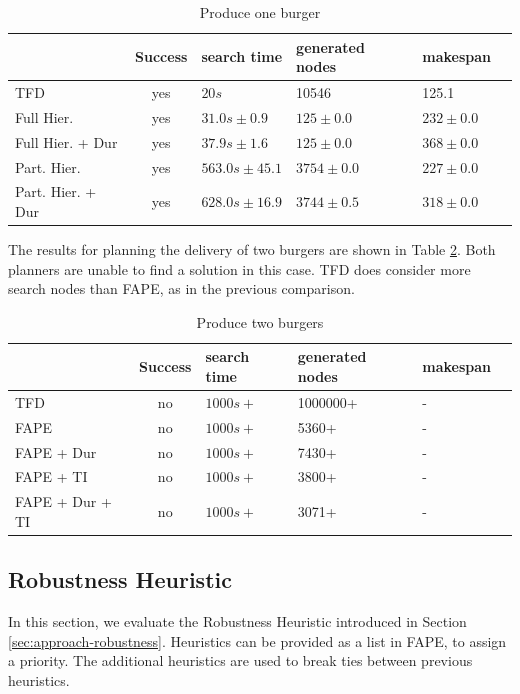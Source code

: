 \begin{table}
  \begin{tabular}{lcllll}
                   & Success & search time  & generated nodes & makespan         \\
    \hline
    TFD             & yes & $20s$            &  10546          &  125.1       \\
    Full Hier.            & yes & $31.0s\pm 0.9$   & $125\pm 0.0$    &  $232\pm 0.0$            \\
    Full Hier. + Dur      & yes & $37.9s\pm 1.6$   & $125\pm 0.0$    &  $368\pm 0.0$      \\
    Part. Hier.      & yes & $563.0s\pm 45.1$ & $3754\pm 0.0$   &  $227\pm 0.0$   \\
    Part. Hier. + Dur & yes & $628.0s\pm 16.9$ & $3744\pm 0.5$   &  $318\pm 0.0$            \\
  \end{tabular}
  \caption{Produce one burger}
  \label{tab:eval-burger}
\end{table}

The results for planning the delivery of two burgers are shown in Table \ref{tab:eval-burgers}.
Both planners are unable to find a solution in this case.
TFD does consider more search nodes than FAPE, as in the previous comparison.

\begin{table}
  \begin{tabular}{lcllll}
    & Success & search time  & generated nodes & makespan         \\
  \hline
  TFD             & no & $1000s+$ & 1000000+ &  -       \\
  FAPE            & no & $1000s+$ & 5360+    &  -          \\
  FAPE + Dur      & no & $1000s+$ & 7430+    &  -    \\
  FAPE + TI       & no & $1000s+$ & 3800+    &  - \\
  FAPE + Dur + TI & no & $1000s+$ & 3071+    &  -          \\
  \end{tabular}
  \caption{Produce two burgers}
  \label{tab:eval-burgers}
\end{table}

\subsection{Robustness Heuristic}

In this section, we evaluate the Robustness Heuristic introduced in Section \ref{sec:approach-robustness}.
Heuristics can be provided as a list in FAPE, to assign a priority.
The additional heuristics are used to break ties between previous heuristics.


